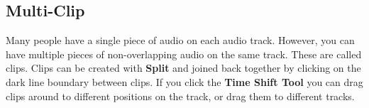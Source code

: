 \documentclass[twocolumn]{book}
\begin{document}
\subsection{Multi-Clip}


Many people have a single piece of audio on each audio track.  However, you can have multiple pieces of non-overlapping audio on the same track.  These are called clips.  Clips can be created with \textbf{Split} and joined back together by clicking on the dark line boundary between clips. If you click the \textbf{Time Shift Tool} you can drag clips around to different positions on the track, or drag them to different tracks.%
% 
%  
% 
%  

											

\iffalse


\fi
\end{document}

